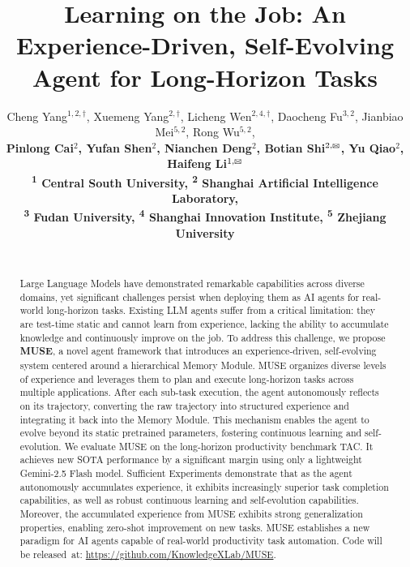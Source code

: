 \documentclass{article}
\title{\huge Learning on the Job: An Experience-Driven, Self-Evolving Agent for Long-Horizon Tasks}
\author{%
Cheng Yang$^{1,2,\dagger}$, Xuemeng Yang$^{2,\dagger}$, Licheng Wen$^{2,4,\dagger}$, Daocheng Fu$^{3,2}$, Jianbiao Mei$^{5,2}$, Rong Wu$^{5,2}$,\\ 
\bf  Pinlong Cai$^{2}$, Yufan Shen$^{2}$, Nianchen Deng$^{2}$,  Botian Shi$^{2,\textrm{\Letter}}$, Yu Qiao$^{2}$, Haifeng Li$^{1,\textrm{\Letter}}$ \\ [1mm]
\textsuperscript{\rm 1} Central South University, 
\textsuperscript{\rm 2} Shanghai Artificial Intelligence Laboratory,\\
\textsuperscript{\rm 3} Fudan University,
\textsuperscript{\rm 4} Shanghai Innovation Institute, 
\textsuperscript{\rm 5} Zhejiang University \\
\\ [1.5mm]
}
\newcommand{\method}{MUSE}
\begin{document}
\maketitle

{
\renewcommand{\thefootnote}{}
} 

\begin{abstract}


Large Language Models have demonstrated remarkable capabilities across diverse domains, yet significant challenges persist when deploying them as AI agents for real-world long-horizon tasks. 
Existing LLM agents suffer from a critical limitation: they are test-time static and cannot learn from experience, lacking the ability to accumulate knowledge and continuously improve on the job.
To address this challenge, we propose \textbf{{\method}}, a novel agent framework that introduces an experience-driven, self-evolving system centered around a hierarchical Memory Module. {\method} organizes diverse levels of experience and leverages them to plan and execute long-horizon tasks across multiple applications. After each sub-task execution, the agent autonomously reflects on its trajectory, converting the raw trajectory into structured experience and integrating it back into the Memory Module. This mechanism enables the agent to evolve beyond its static pretrained parameters, fostering continuous learning and self-evolution. We evaluate {\method} on the long-horizon productivity benchmark TAC. It achieves new SOTA performance by a significant margin using only a lightweight Gemini-2.5 Flash model. Sufficient Experiments demonstrate that as the agent autonomously accumulates experience, it exhibits increasingly superior task completion capabilities, as well as robust continuous learning and self-evolution capabilities. Moreover, the accumulated experience from {\method} exhibits strong generalization properties, enabling zero-shot improvement on new tasks. {\method} establishes a new paradigm for AI agents capable of real-world productivity task automation.
Code will be released~at: \url{https://github.com/KnowledgeXLab/MUSE}.

\end{abstract}






% 









\end{document}
